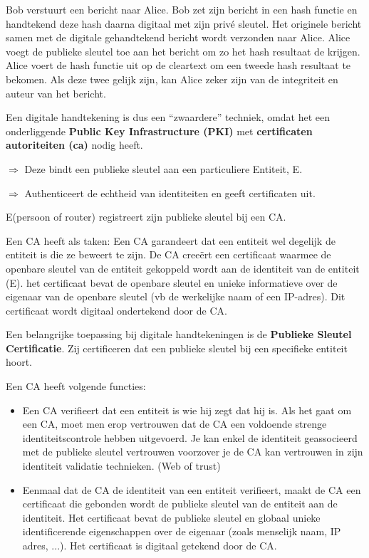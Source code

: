 \noindent Bob verstuurt een bericht naar Alice. Bob zet zijn bericht in een hash functie en handtekend deze hash daarna digitaal met zijn privé sleutel. Het originele bericht samen met de digitale gehandtekend bericht wordt verzonden naar Alice. Alice voegt de publieke sleutel toe aan het bericht om zo het hash resultaat de krijgen. Alice voert de hash functie uit op de cleartext om een tweede hash resultaat te bekomen. Als deze twee gelijk zijn, kan Alice zeker zijn van de integriteit en auteur van het bericht.

\noindent Een digitale handtekening is dus een “zwaardere” techniek, omdat het een onderliggende \textbf{Public Key Infrastructure (PKI)} met \textbf{ certificaten autoriteiten (\acrshort{ca})} nodig heeft.


\noindent $\Rightarrow$ Deze bindt een publieke sleutel aan een particuliere Entiteit, E.

\noindent $\Rightarrow$ Authenticeert de echtheid van identiteiten en geeft certificaten uit.

\noindent E(persoon of router) registreert zijn publieke sleutel bij een CA.

\noindent Een CA heeft als taken:
\bi
\itf Een CA garandeert dat een entiteit wel degelijk de entiteit is die ze beweert te zijn.
\itf De CA creeërt een certificaat waarmee de openbare sleutel van de entiteit gekoppeld wordt aan de identiteit van de entiteit (E).
    \bi
    \itf het certificaat bevat de openbare sleutel en unieke informatieve over de eigenaar van de openbare sleutel (vb de werkelijke naam of een IP-adres). Dit certificaat wordt digitaal ondertekend door de CA. 
    \ei
\ei


Een belangrijke toepassing bij digitale handtekeningen is de \textbf{Publieke Sleutel Certificatie}. Zij certificeren dat een publieke sleutel bij een specifieke entiteit hoort.

\noindent Een CA heeft volgende functies:
\begin{itemize}
\item Een CA verifieert dat een entiteit is wie hij zegt dat hij is. Als het gaat om een CA, moet men erop vertrouwen dat de CA een voldoende strenge identiteitscontrole hebben uitgevoerd. Je kan enkel de identiteit geassocieerd met de publieke sleutel vertrouwen voorzover je de CA kan vertrouwen in zijn identiteit validatie technieken. (Web of trust)
\item Eenmaal dat de CA de identiteit van een entiteit verifieert, maakt de CA een certificaat die gebonden wordt de publieke sleutel van de entiteit aan de identiteit. Het certificaat bevat de publieke sleutel en globaal unieke identificerende eigenschappen over de eigenaar (zoals menselijk naam, IP adres, ...). Het certificaat is digitaal getekend door de CA.
\end{itemize}

